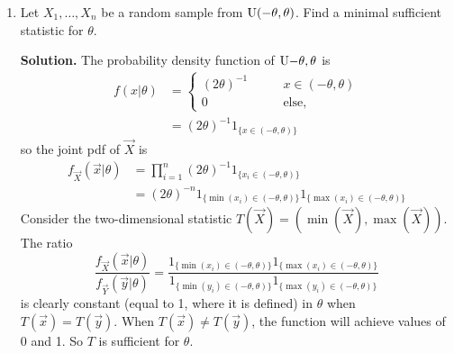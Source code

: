 \documentclass[titlepage]{article}
\begin{document}
\begin{enumerate}
\item Let $X_1, \ldots, X_n$ be a random sample from $\text{U}(-\theta, \theta)$. Find a minimal sufficient statistic for $\theta$.

\textbf{Solution.} The probability density function of $\text{U}{-\theta, \theta}$ is
\[\begin{aligned}
f(x | \theta) &=
\begin{cases}
(2\theta)^{-1} & \qquad x \in (-\theta, \theta) \\
0 & \qquad \text{else},
\end{cases} \\
&= (2\theta)^{-1}1_{\{x \in (-\theta, \theta)\}}
\end{aligned}\]
so the joint pdf of $\vec{X}$ is
\[\begin{aligned}
f_\vec{X}(\vec{x}|\theta) &= \prod_{i=1}^n (2\theta)^{-1}1_{\{x_i \in (-\theta, \theta)\}}\\
&= (2\theta)^{-n}1_{\{\min(x_i) \in (-\theta, \theta)\}}1_{\{\max(x_i) \in (-\theta, \theta)\}}
\end{aligned}\]
Consider the two-dimensional statistic $T(\vec{X}) = (\min(\vec{X}), \max(\vec{X}))$. The ratio
\[
\frac{f_\vec{X}(\vec{x} | \theta)}{f_{\vec{Y}}(\vec{y} | \theta)} = \frac{1_{\{\min(x_i) \in (-\theta, \theta)\}}1_{\{\max(x_i) \in (-\theta, \theta)\}}}{1_{\{\min(y_i) \in (-\theta, \theta)\}}1_{\{\max(y_i) \in (-\theta, \theta)\}}}
\]
is clearly constant (equal to 1, where it is defined) in $\theta$ when $T(\vec{x}) = T(\vec{y})$. When $T(\vec{x}) \neq T(\vec{y})$, the function will achieve values of 0 and 1. So $T$ is sufficient for $\theta$.
\end{enumerate}
\end{document}

